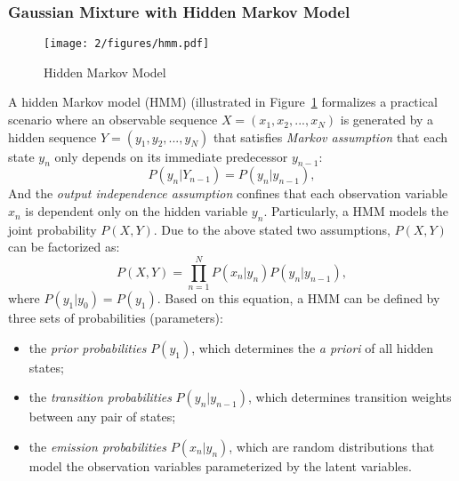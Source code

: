 \subsubsection{Gaussian Mixture with Hidden Markov Model}
\begin{figure}[htb]
\centering
\texttt{[image: 2/figures/hmm.pdf]}
\caption{Hidden Markov Model}
\label{fig:2-hmm}
\end{figure}
A hidden Markov model (HMM) (illustrated in Figure~\ref{fig:2-hmm} formalizes a practical scenario where an observable sequence $X=(x_1,x_2,...,x_N)$ is generated by a hidden sequence $Y = (y_1,y_2,...,y_N)$ that satisfies {\it Markov assumption} \cite{gardiner1985handbook} that each state $y_n$ only depends on its immediate predecessor $y_{n-1}$:
\begin{equation}\label{eq:2-mp}
P(y_n|Y_{n-1}) = P(y_n|y_{n-1}),
\end{equation}
And the {\it output independence assumption} confines that each observation variable $x_n$ is dependent only on the hidden variable $y_n$. Particularly, a HMM models the joint probability $P(X,Y)$. Due to the above stated two assumptions, $P(X,Y)$ can be factorized as:
\begin{equation}\label{eq:2-hmm}
P(X,Y) = \prod_{n=1}^N P(x_n|y_n)P(y_n|y_{n-1}),
\end{equation}
where $P(y_1|y_0)=P(y_1)$. Based on this equation, a HMM can be defined by three sets of probabilities (parameters):
\begin{itemize}
\item the {\it prior probabilities} $P(y_1)$, which determines the {\it a priori} of all hidden states;
\item the {\it transition probabilities} $P(y_n|y_{n-1})$, which determines transition weights between any pair of states;
\item the {\it emission probabilities} $P(x_n|y_n)$, which are random distributions that model the observation variables parameterized by the latent variables.
\end{itemize}

